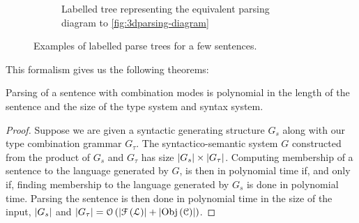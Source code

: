 \begin{figure}
	\begin{subfigure}{.45\textwidth}
		\centering
		\caption{Labelled tree representing the equivalent parsing diagram to
			\ref{fig:3dparsing-diagram}}
		\label{fig:tree-rain}
	\end{subfigure}
	\caption{Examples of labelled parse trees for a few sentences.}
	\label{fig:parsing-trees}
\end{figure}

This formalism gives us the following theorems:

\begin{theorem}
	\label{thm:ptime-parse}
	Parsing of a sentence with combination modes is polynomial in the length of
	the	sentence and the size of the type system and syntax system.
\end{theorem}

\begin{proof}
	Suppose we are given a syntactic generating structure $G_{s}$ along with our
	type combination grammar $G_{\tau}$.
	The syntactico-semantic system $G$ constructed from the product of $G_{s}$ and
	$G_{\tau}$ has size $\left|G_{s}\right|\times \left|G_{\tau}\right|$.
	Computing membership of a sentence to the language generated by $G$, is then
	in polynomial time if, and only if, finding membership to the language
	generated by $G_{s}$ is done in polynomial time.
	Parsing the sentence is then done in polynomial time in the size of the
	input, $\left|G_{s}\right|$ and
	$\left|G_{\tau}\right| = \mathcal{O}\left(\left|\mathcal{F}\left(\mathcal{L}\right)\right| + \left|\operatorname{Obj}\left(\mathcal{C}\right)\right|\right)$.
\end{proof}

